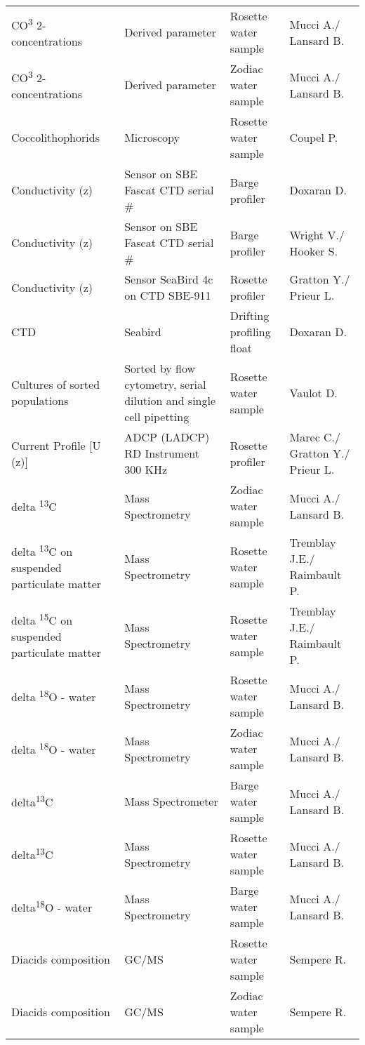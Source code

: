 \begin{longtable}[t]{llll}
CO\textsuperscript{3} 2- concentrations & Derived parameter & Rosette water sample & Mucci A./ Lansard B.\\
\addlinespace
CO\textsuperscript{3} 2- concentrations & Derived parameter & Zodiac water sample & Mucci A./ Lansard B.\\
Coccolithophorids & Microscopy & Rosette water sample & Coupel P.\\
Conductivity (z) & Sensor on SBE Fascat CTD serial \# & Barge profiler & Doxaran D.\\
Conductivity (z) & Sensor on SBE Fascat CTD serial \# & Barge profiler & Wright V./ Hooker S.\\
Conductivity (z) & Sensor SeaBird 4c on CTD SBE-911 & Rosette profiler & Gratton Y./ Prieur L.\\
\addlinespace
CTD & Seabird & Drifting profiling float & Doxaran D.\\
Cultures of sorted populations & Sorted by flow cytometry, serial dilution and single cell pipetting & Rosette water sample & Vaulot D.\\
Current Profile [U (z)] & ADCP (LADCP) RD Instrument 300 KHz & Rosette profiler & Marec C./ Gratton Y./ Prieur L.\\
delta \textsuperscript{13}C & Mass Spectrometry & Zodiac water sample & Mucci A./ Lansard B.\\
delta \textsuperscript{13}C on suspended particulate matter & Mass Spectrometry & Rosette water sample & Tremblay J.E./ Raimbault P.\\
\addlinespace
delta \textsuperscript{15}C on suspended particulate matter & Mass Spectrometry & Rosette water sample & Tremblay J.E./ Raimbault P.\\
delta \textsuperscript{18}O - water & Mass Spectrometry & Rosette water sample & Mucci A./ Lansard B.\\
delta \textsuperscript{18}O - water & Mass Spectrometry & Zodiac water sample & Mucci A./ Lansard B.\\
delta\textsuperscript{13}C & Mass Spectrometer & Barge water sample & Mucci A./ Lansard B.\\
delta\textsuperscript{13}C & Mass Spectrometry & Rosette water sample & Mucci A./ Lansard B.\\
\addlinespace
delta\textsuperscript{18}O - water & Mass Spectrometry & Barge water sample & Mucci A./ Lansard B.\\
Diacids composition & GC/MS & Rosette water sample & Sempere R.\\
Diacids composition & GC/MS & Zodiac water sample & Sempere R.\\

\end{longtable}

